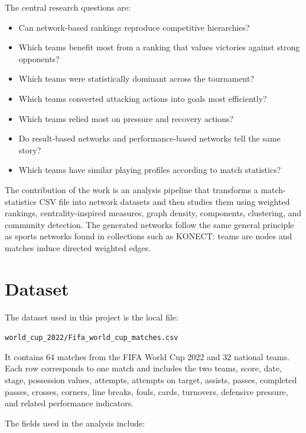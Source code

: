 \documentclass[10pt,twocolumn]{article}
\begin{document}
The central research questions are:

\begin{itemize}
    \item Can network-based rankings reproduce competitive hierarchies?
    \item Which teams benefit most from a ranking that values victories against strong opponents?
    \item Which teams were statistically dominant across the tournament?
    \item Which teams converted attacking actions into goals most efficiently?
    \item Which teams relied most on pressure and recovery actions?
    \item Do result-based networks and performance-based networks tell the same story?
    \item Which teams have similar playing profiles according to match statistics?
\end{itemize}

The contribution of the work is an analysis pipeline that transforms a match-statistics CSV file into network datasets and then studies them using weighted rankings, centrality-inspired measures, graph density, components, clustering, and community detection. The generated networks follow the same general principle as sports networks found in collections such as KONECT: teams are nodes and matches induce directed weighted edges.

\section{Dataset}

The dataset used in this project is the local file:

\begin{center}
\texttt{world\_cup\_2022/Fifa\_world\_cup\_matches.csv}
\end{center}

It contains 64 matches from the FIFA World Cup 2022 and 32 national teams. Each row corresponds to one match and includes the two teams, score, date, stage, possession values, attempts, attempts on target, assists, passes, completed passes, crosses, corners, line breaks, fouls, cards, turnovers, defensive pressure, and related performance indicators.

The fields used in the analysis include:
\end{document}
